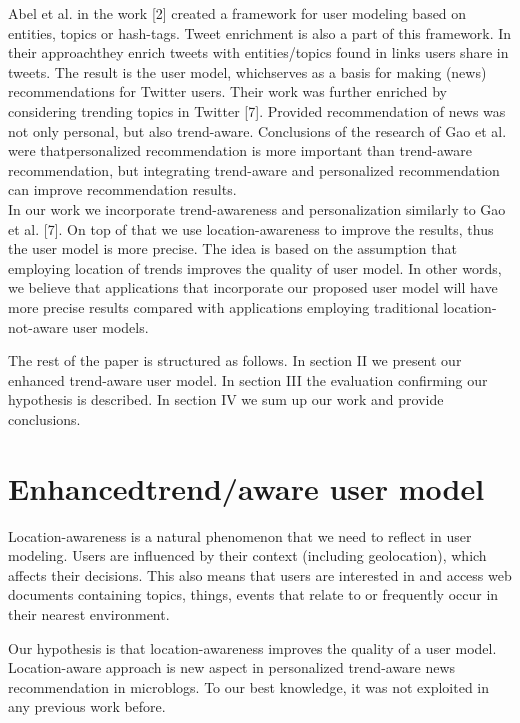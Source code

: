 \documentclass[a4, conference]{IEEEtran}
\begin{document}
Abel  et  al.  in  the  work  [2]  created  a  framework  for  user modeling   based   on   entities,   topics   or   hash-tags.   Tweet enrichment is also a part of this framework. In their approachthey  enrich  tweets  with  entities/topics  found  in  links  users share in tweets. The result is the user model, whichserves as a  basis  for  making  (news)  recommendations  for  Twitter users.   Their   work   was   further   enriched   by   considering trending  topics in Twitter [7].   Provided recommendation  of news    was    not    only    personal,    but    also    trend-aware. Conclusions   of   the   research   of   Gao   et   al.   were   thatpersonalized  recommendation  is  more important  than trend-aware   recommendation,   but   integrating   trend-aware   and personalized  recommendation  can  improve  recommendation results. \\
 In   our    work    we   incorporate   trend-awareness    and personalization similarly to Gao et al. [7]. On top of that we use  location-awareness  to  improve  the  results,  thus  the  user model  is  more  precise.  The  idea  is based  on  the  assumption that  employing  location  of  trends  improves  the  quality  of user model. In other words, we believe that applications that incorporate our proposed  user  model will  have  more precise results  compared  with  applications  employing  traditional location-not-aware user models.

The rest of the paper is structured as follows. In section II we  present our enhanced trend-aware  user  model.  In section III the evaluation  confirming  our  hypothesis  is  described. In section IV we sum up our work and provide conclusions. 

\section{Enhancedtrend/aware user model}
Location-awareness  is  a  natural  phenomenon  that  we need  to  reflect  in  user  modeling.  Users  are  influenced  by their  context  (including  geolocation),  which  affects  their decisions. This  also  means  that  users  are  interested  in  and access  web  documents  containing  topics,  things,  events  that relate to or frequently occur in their nearest environment. 

Our hypothesis  is  that  location-awareness  improves the quality  of  a  user  model.  Location-aware  approach  is  new aspect  in  personalized  trend-aware  news  recommendation  in microblogs.  To  our  best  knowledge,  it  was  not  exploited  in any previous work before.
\end{document}
